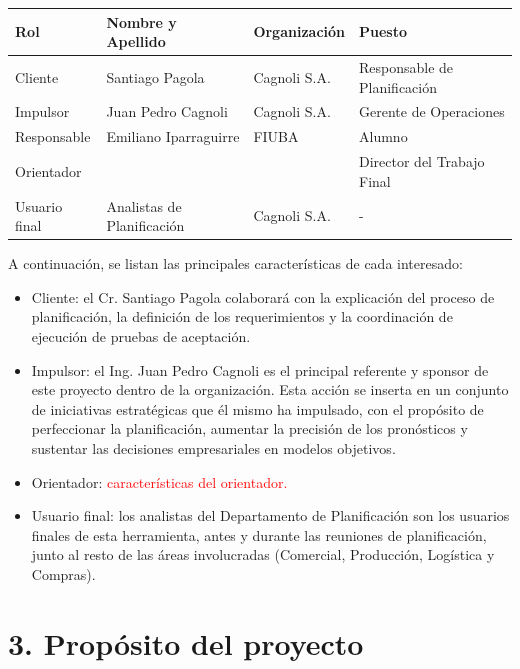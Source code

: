 \documentclass[
11pt, %
]{charter}
\begin{document}
\begin{table}[ht]
\begin{tabularx}{\linewidth}{@{}|l|X|X|l|@{}}
\hline
\rowcolor[HTML]{C0C0C0} 
Rol           & Nombre y Apellido & Organización 	& Puesto 	\\ \hline
Cliente       & Santiago Pagola      &	Cagnoli S.A.	&	Responsable de Planificación       	\\ \hline
Impulsor      & Juan Pedro Cagnoli                  &  Cagnoli S.A.            	&  Gerente de Operaciones      	\\ \hline
Responsable   & Emiliano Iparraguirre       & FIUBA        	& Alumno 	\\ \hline
Orientador    & \supname	      & \pertesupname 	& Director del Trabajo Final \\ \hline
Usuario final & Analistas de Planificación                  & Cagnoli S.A.             	&  -      	\\ \hline
\end{tabularx}
\end{table}
\pagebreak

A continuación, se listan las principales características de cada interesado:
\begin{itemize}
	\item Cliente: el Cr. Santiago Pagola colaborará con la explicación del proceso de planificación, la definición de los requerimientos y la coordinación de ejecución de pruebas de aceptación.
	\item Impulsor: el Ing. Juan Pedro Cagnoli es el principal referente y sponsor de este proyecto dentro de la organización. Esta acción se inserta en un conjunto de iniciativas estratégicas que él mismo ha impulsado, con el propósito de perfeccionar la planificación, aumentar la precisión de los pronósticos y sustentar las decisiones empresariales en modelos objetivos.
	\item Orientador: \textcolor{red}{características del orientador.}
	\item Usuario final: los analistas del Departamento de Planificación son los usuarios finales de esta herramienta, antes y durante las reuniones de planificación, junto al resto de las áreas involucradas (Comercial, Producción, Logística y Compras).
\end{itemize}


\section{3. Propósito del proyecto}
\label{sec:proposito}
\end{document}
